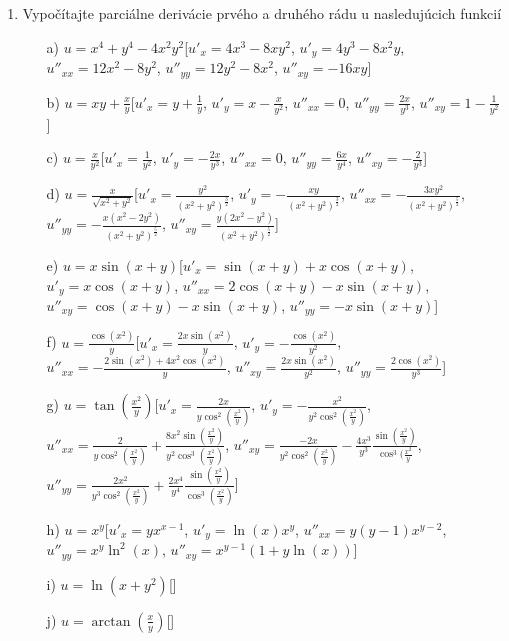 \begin{enumerate}
\item Vypočítajte parciálne derivácie prvého a druhého rádu u nasledujúcich funkcií
\begin{enumerate}
\item[a)]{$u=x^4+y^4-4x^2y^2$}\hspace{\fill}[$u'_{x}=4x^3-8xy^2$, $u'_y=4y^3-8x^2y$, $u''_{xx}=12x^2-8y^2$, $u''_{yy}=12y^2-8x^2$, $u''_{xy}=-16xy$]
\item[b)]{$u=xy+\frac{x}{y}$}\hspace{\fill}[$u'_{x}=y+\frac{1}{y}$, $u'_y=x-\frac{x}{y^2}$, $u''_{xx}=0$, $u''_{yy}=\frac{2x}{y^3}$, $u''_{xy}=1-\frac{1}{y^2}$]
\item[c)]{$u=\frac{x}{y^2}$}\hspace{\fill}[$u'_{x}=\frac{1}{y^2}$, $u'_y=-\frac{2x}{y^3}$, $u''_{xx}=0$, $u''_{yy}=\frac{6x}{y^4}$, $u''_{xy}=-\frac{2}{y^3}$]
\item[d)]{$u=\frac{x}{\sqrt{x^2+y^2}}$}\hspace{\fill}[$u'_{x}=\frac{y^2}{(x^2+y^2)^{\frac{3}{2}}}$, $u'_y=-\frac{xy}{(x^2+y^2)^{\frac{3}{2}}}$, $u''_{xx}=-\frac{3xy^2}{(x^2+y^2)^{\frac{5}{2}}}$, $u''_{yy}=-\frac{x(x^2-2y^2)}{(x^2+y^2)^{\frac{5}{2}}}$, $u''_{xy}=\frac{y(2x^2-y^2)}{(x^2+y^2)^{\frac{5}{2}}}$]
\item[e)]{$u=x\sin(x+y)$}\hspace{\fill}[$u'_x=\sin(x+y)+x\cos(x+y)$, $u'_y=x\cos(x+y)$, $u''_{xx}=2\cos(x+y)-x\sin(x+y)$, $u''_{xy}=\cos(x+y)-x\sin(x+y)$, $u''_{yy}=-x\sin(x+y)$]
\item[f)]{$u=\frac{\cos(x^2)}{y}$}\hspace{\fill}[$u'_x=\frac{2x\sin(x^2)}{y}$, $u'_y=-\frac{\cos(x^2)}{y^2}$, $u''_{xx}=-\frac{2\sin(x^2)+4x^2\cos(x^2)}{y}$, $u''_{xy}=\frac{2x\sin(x^2)}{y^2}$, $u''_{yy}=\frac{2\cos(x^2)}{y^3}$]
\item[g)]{$u=\tan(\frac{x^2}{y})$}\hspace{\fill}[$u'_x=\frac{2x}{y\cos^2(\frac{x^2}{y})}$, $u'_y=-\frac{x^2}{y^2\cos^2(\frac{x^2}{y})}$, $u''_{xx}=\frac{2}{y\cos^2(\frac{x^2}{y})}+\frac{8x^2\sin(\frac{x^2}{y})}{y^2\cos^3(\frac{x^2}{y})}$, $u''_{xy}=\frac{-2x}{y^2\cos^2(\frac{x^2}{y})}-\frac{4x^3}{y^3}\frac{\sin(\frac{x^2}{y})}{\cos^3(\frac{x^2}{y}}$, $u''_{yy}=\frac{2x^2}{y^3\cos^2(\frac{x^2}{y})}+\frac{2x^4}{y^4}\frac{\sin(\frac{x^2}{y})}{\cos^3(\frac{x^2}{y})}$]
\item[h)]{$u=x^y$}\hspace{\fill}[$u'_x=yx^{x-1}$, $u'_y=\ln(x)x^{y}$, $u''_{xx}=y(y-1)x^{y-2}$, $u''_{yy}=x^{y}\ln^2(x)$, $u''_{xy}=x^{y-1}(1+y\ln(x))$]
\item[i)]{$u=\ln(x+y^2)$}\hspace{\fill}[]
\item[j)]{$u=\arctan(\frac{x}{y})$}\hspace{\fill}[]
\end{enumerate}


\end{enumerate}
